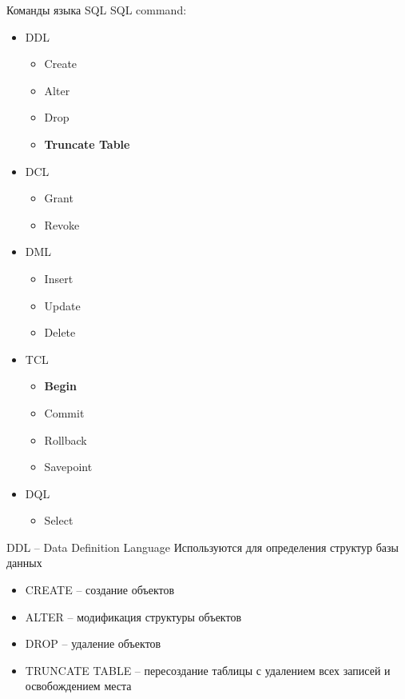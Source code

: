 \documentclass[12pt]{article}
\begin{document}
\begin{nota}{Команды языка SQL}
    SQL command:
    \begin{itemize}
        \item DDL 
        
        \begin{itemize}
            \item Create 
            \item Alter 
            \item Drop 
            \item \textbf{Truncate Table}
        \end{itemize}

        \item DCL 
        
        \begin{itemize}
            \item Grant
            \item Revoke 
        \end{itemize}

        \item DML 
        
        \begin{itemize}
            \item Insert
            \item Update 
            \item Delete
        \end{itemize}

        \item TCL 
        
        \begin{itemize}
            \item \textbf{Begin}
            \item Commit 
            \item Rollback 
            \item Savepoint
        \end{itemize}

        \item DQL
        
        \begin{itemize}
            \item Select
        \end{itemize}
    \end{itemize}
\end{nota}

\begin{Remark}{DDL -- Data Definition Language}
    Используются для определения структур базы данных 

    \begin{itemize}
        \item CREATE -- создание объектов 
        \item ALTER -- модификация структуры объектов 
        \item DROP -- удаление объектов
        \item TRUNCATE TABLE -- пересоздание таблицы с удалением всех записей и освобождением места
    \end{itemize}
\end{Remark}
\end{document}
